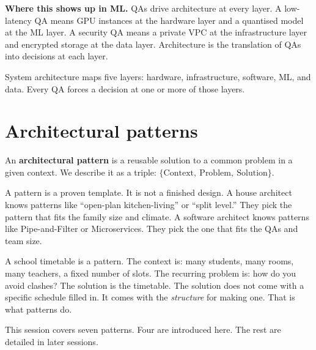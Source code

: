 \documentclass[a4paper,11pt]{article}
\newcommand{\vocab}[1]{\textbf{\color{navy}#1}}
\begin{document}
\noindent\textbf{Where this shows up in ML.}
QAs drive architecture at every layer. A low-latency QA means GPU
instances at the hardware layer and a quantised model at the ML layer.
A security QA means a private VPC at the infrastructure layer and
encrypted storage at the data layer. Architecture is the translation
of QAs into decisions at each layer.

\begin{keytake}
System architecture maps five layers: hardware, infrastructure, software,
ML, and data. Every QA forces a decision at one or more of those layers.
\end{keytake}

\section{Architectural patterns}

An \vocab{architectural pattern} is a reusable solution to a common
problem in a given context. We describe it as a triple:
$\{\text{Context},\ \text{Problem},\ \text{Solution}\}$.

\begin{intuition}
A pattern is a proven template. It is not a finished design. A house
architect knows patterns like ``open-plan kitchen-living'' or ``split
level.'' They pick the pattern that fits the family size and climate.
A software architect knows patterns like Pipe-and-Filter or Microservices.
They pick the one that fits the QAs and team size.
\end{intuition}

\begin{everyday}
A school timetable is a pattern. The context is: many students, many
rooms, many teachers, a fixed number of slots. The recurring problem is:
how do you avoid clashes? The solution is the timetable. The solution
does not come with a specific schedule filled in. It comes with the
\emph{structure} for making one. That is what patterns do.
\end{everyday}

This session covers seven patterns. Four are introduced here. The
rest are detailed in later sessions.
\end{document}
